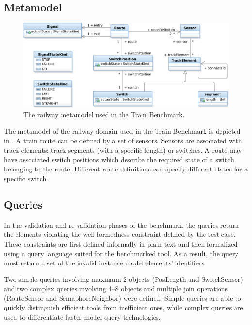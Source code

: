 \subsection{Metamodel}
\label{sec:domain}

\begin{figure}[htb]
\begin{center}
\includegraphics[width=1\columnwidth]{figures/TrainMM.pdf}
\caption{The railway metamodel used in the Train Benchmark.}
\label{fig:metamodel}
\end{center}
\end{figure}


The metamodel of the railway domain used in the Train Benchmark is depicted in . A train \textsf{route} can be defined by a set of \textsf{sensors}. Sensors are associated with \textsf{track elements}: track \textsf{segment}s (with a specific length) or \textsf{switch}es. A route may have associated \textsf{switch positions} which describe the required state of a switch belonging to the route. Different route definitions can specify different states for a specific switch.
 
\subsection{Queries}
\label{sec:queries}

In the validation and re-validation phases of the benchmark, the queries return the elements violating the well-formedness constraint defined by the test case. These constraints are first defined informally in plain text and then formalized using a query language suited for the benchmarked tool. As a result, the query must return a set of the invalid instance model elements' identifiers.
 
Two simple queries involving maximum 2 objects (\textsf{PosLength} and \textsf{SwitchSensor}) and two complex queries involving 4--8 objects and multiple join operations (\textsf{RouteSensor} and \textsf{SemaphoreNeighbor}) were defined. Simple queries are able to quickly distinguish efficient tools from inefficient ones, while complex queries are used to differentiate faster model query technologies.
 
